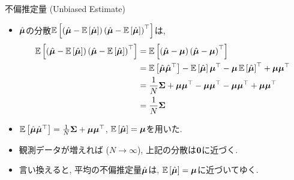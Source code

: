 \documentclass[dvipdfmx,notheorems,t]{beamer}
\begin{document}
\begin{frame}{不偏推定量 (Unbiased Estimate)}
\begin{itemize}
  \item $\hat{\vb*{\mu}}$の分散$\operatorname{\mathbb{E}} \left[ \left( \hat{\vb*{\mu}} - \operatorname{\mathbb{E}} \left[ \hat{\vb*{\mu}} \right] \right)
  \left( \hat{\vb*{\mu}} - \operatorname{\mathbb{E}} \left[ \hat{\vb*{\mu}} \right] \right)^\top \right]$は,
  {\small \begin{align*}
    \operatorname{\mathbb{E}} \left[ \left( \hat{\vb*{\mu}} - \operatorname{\mathbb{E}} \left[ \hat{\vb*{\mu}} \right] \right)
      \left( \hat{\vb*{\mu}} - \operatorname{\mathbb{E}} \left[ \hat{\vb*{\mu}} \right] \right)^\top \right]
    &= \operatorname{\mathbb{E}} \left[ \left( \hat{\vb*{\mu}} - \vb*{\mu} \right) \left( \hat{\vb*{\mu}} - \vb*{\mu} \right)^\top \right] \\
    &= \operatorname{\mathbb{E}} \left[ \hat{\vb*{\mu}} \hat{\vb*{\mu}}^\top \right]
      - \operatorname{\mathbb{E}} \left[ \hat{\vb*{\mu}} \right] \vb*{\mu}^\top - \vb*{\mu} \operatorname{\mathbb{E}} \left[ \hat{\vb*{\mu}} \right]^\top
      + \vb*{\mu} \vb*{\mu}^\top \\
    &= \frac{1}{N} \vb{\Sigma} + \vb*{\mu} \vb*{\mu}^\top
      - \vb*{\mu} \vb*{\mu}^\top - \vb*{\mu} \vb*{\mu}^\top
      + \vb*{\mu} \vb*{\mu}^\top \\
    &= \frac{1}{N} \vb{\Sigma}
  \end{align*}}
  \item $\operatorname{\mathbb{E}} \left[ \hat{\vb*{\mu}} \hat{\vb*{\mu}}^\top \right] = \frac{1}{N} \vb{\Sigma} + \vb*{\mu} \vb*{\mu}^\top$,
  $\operatorname{\mathbb{E}} \left[ \hat{\vb*{\mu}} \right] = \vb*{\mu}$を用いた.
  \item 観測データが増えれば ($N \to \infty$), 上記の分散は$\vb{0}$に近づく.
  \item 言い換えると, 平均の不偏推定量$\hat{\vb*{\mu}}$は, $\operatorname{\mathbb{E}} \left[ \hat{\vb*{\mu}} \right] = \vb*{\mu}$に近づいてゆく.
\end{itemize}
\end{frame}
\end{document}
